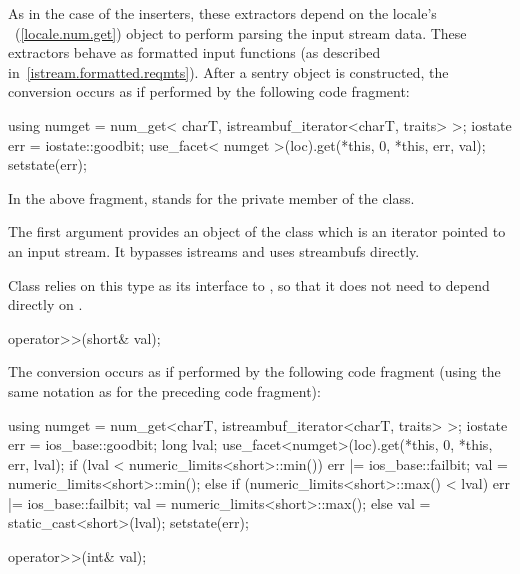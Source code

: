 \begin{itemdescr}
\pnum
As in the case of the inserters, these extractors depend on the
locale's
~(\ref{locale.num.get}) object to perform parsing the input
stream data.
These extractors behave as formatted input functions (as described in~\ref{istream.formatted.reqmts}).  After a sentry object is constructed, the
conversion occurs as if performed by the following code fragment:

\begin{codeblock}
using numget = num_get< charT, istreambuf_iterator<charT, traits> >;
iostate err = iostate::goodbit;
use_facet< numget >(loc).get(*this, 0, *this, err, val);
setstate(err);
\end{codeblock}

In the above fragment,
stands for the private member of the
class.
\begin{note}
The first argument provides an object of the
class which is an iterator pointed to an input stream.
It bypasses istreams and uses streambufs directly.
\end{note}
Class
relies on this
type as its interface to
,
so that it does not need to depend directly on
.
\end{itemdescr}

%
%
\begin{itemdecl}
operator>>(short& val);
\end{itemdecl}

\begin{itemdescr}
\pnum
The conversion occurs as if performed by the following code fragment
(using the same notation as for the preceding code fragment):
\begin{codeblock}
using numget = num_get<charT, istreambuf_iterator<charT, traits> >;
iostate err = ios_base::goodbit;
long lval;
use_facet<numget>(loc).get(*this, 0, *this, err, lval);
if (lval < numeric_limits<short>::min()) {
  err |= ios_base::failbit;
  val = numeric_limits<short>::min();
} else if (numeric_limits<short>::max() < lval) {
  err |= ios_base::failbit;
  val = numeric_limits<short>::max();
}  else
  val = static_cast<short>(lval);
setstate(err);
\end{codeblock}
\end{itemdescr}

%
%
\begin{itemdecl}
operator>>(int& val);
\end{itemdecl}

